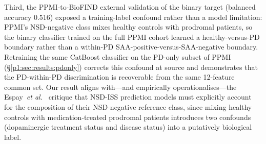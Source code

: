 Third, the PPMI-to-BioFIND external validation of the binary target (balanced accuracy 0.516) exposed a training-label confound rather than a model limitation: PPMI's NSD-negative class mixes healthy controls with prodromal patients, so the binary classifier trained on the full PPMI cohort learned a healthy-versus-PD boundary rather than a within-PD SAA-positive-versus-SAA-negative boundary. Retraining the same CatBoost classifier on the PD-only subset of PPMI (\S\ref{p1:sec:results:pdonly}) corrects this confound at source and demonstrates that the PD-within-PD discrimination is recoverable from the same 12-feature common set. Our result aligns with---and empirically operationalises---the Espay~\textit{et al.}~\cite{espay2025med} critique that NSD-ISS prediction models must explicitly account for the composition of their NSD-negative reference class, since mixing healthy controls with medication-treated prodromal patients introduces two confounds (dopaminergic treatment status and disease status) into a putatively biological label.

